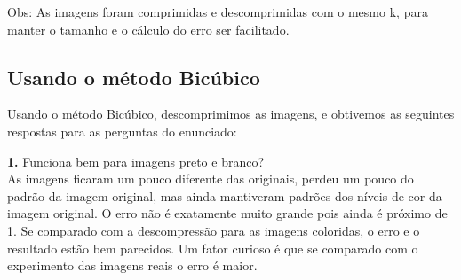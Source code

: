 \documentclass[12pt,letterpaper]{article}
\begin{document}
	\begin{figure}[h]
	\end{figure}
	
	Obs: As imagens foram comprimidas e descomprimidas com o mesmo k, para manter o tamanho e o cálculo do erro ser facilitado.
	
	\clearpage
	
	\subsection{Usando o método Bicúbico}

	Usando o método Bicúbico, descomprimimos as imagens, e obtivemos as seguintes respostas para as perguntas do enunciado:
	
	
	\textbf{1.} Funciona bem para imagens preto e branco?\\
	As imagens ficaram um pouco diferente das originais, perdeu um pouco do padrão da imagem original, mas ainda mantiveram padrões dos níveis de cor da imagem original. O erro não é exatamente muito grande pois ainda é próximo de 1. Se comparado com a descompressão para as imagens coloridas, o erro e o resultado estão bem parecidos. Um fator curioso é que se comparado com o experimento das imagens reais o erro é maior.\\
	
\end{document}

